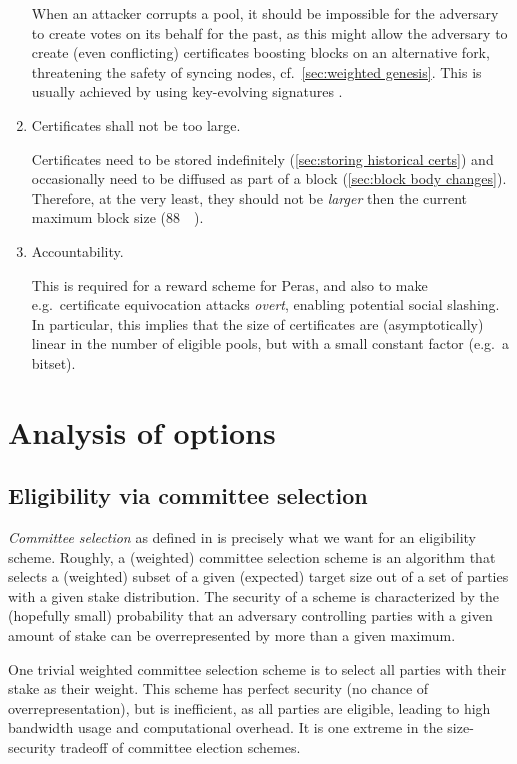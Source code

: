 \begin{enumerate}
  When an attacker corrupts a pool, it should be impossible for the adversary to create votes on its behalf for the past, as this might allow the adversary to create (even conflicting) certificates boosting blocks on an alternative fork, threatening the safety of syncing nodes, cf.~\cref{sec:weighted genesis}.
  This is usually achieved by using key-evolving signatures \parencite{bellare1999forward}.
\item
  Certificates shall not be too large.

  Certificates need to be stored indefinitely (\cref{sec:storing historical certs}) and occasionally need to be diffused as part of a block (\cref{sec:block body changes}).
  Therefore, at the very least, they should not be \emph{larger} then the current maximum block size (\qty{88}{\kibi\byte}).
\item
  Accountability.

  This is required for a reward scheme for Peras, and also to make e.g.\ certificate equivocation attacks \emph{overt}, enabling potential social slashing.
  In particular, this implies that the size of certificates are (asymptotically) linear in the number of eligible pools, but with a small constant factor (e.g.\ a bitset).
\end{enumerate}

\section{Analysis of options}

\subsection{Eligibility via committee selection}

\emph{Committee selection} as defined in \cite{gavzi2023fait} is precisely what we want for an eligibility scheme.
Roughly, a (weighted) committee selection scheme is an algorithm that selects a (weighted) subset of a given (expected) target size out of a set of parties with a given stake distribution.
The security of a scheme is characterized by the (hopefully small) probability that an adversary controlling parties with a given amount of stake can be overrepresented by more than a given maximum.

One trivial weighted committee selection scheme is to select all parties with their stake as their weight.
This scheme has perfect security (no chance of overrepresentation), but is inefficient, as all parties are eligible, leading to high bandwidth usage and computational overhead.
It is one extreme in the size-security tradeoff of committee election schemes.


